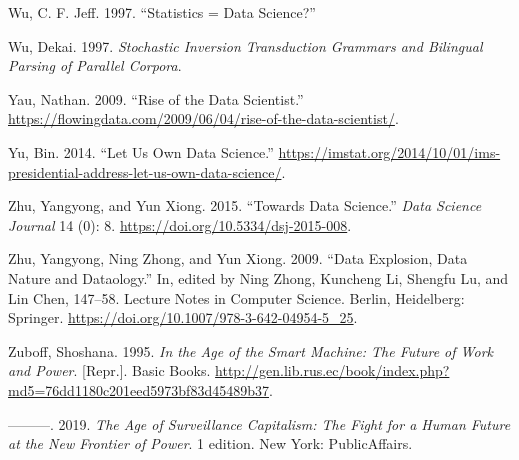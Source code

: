 \documentclass[
  letterpaper,
]{report}
\newlength{\cslhangindent}
\newlength{\cslentryspacingunit} %
\newenvironment{CSLReferences}[2] %
 {%
  \setlength{\parindent}{0pt}
  \ifodd #1
  \let\oldpar\par
  \def\par{\hangindent=\cslhangindent\oldpar}
  \fi
  \setlength{\parskip}{#2\cslentryspacingunit}
 }%
 {}
\begin{document}
\begin{CSLReferences}{1}{0}
\leavevmode{}%
Wu, C. F. Jeff. 1997. {``Statistics = Data Science?''}

\leavevmode{}%
Wu, Dekai. 1997. \emph{Stochastic Inversion Transduction Grammars and
Bilingual Parsing of Parallel Corpora}.

\leavevmode{}%
Yau, Nathan. 2009. {``Rise of the Data Scientist.''}
\url{https://flowingdata.com/2009/06/04/rise-of-the-data-scientist/}.

\leavevmode{}%
Yu, Bin. 2014. {``Let Us Own Data Science.''}
\url{https://imstat.org/2014/10/01/ims-presidential-address-let-us-own-data-science/}.

\leavevmode{}%
Zhu, Yangyong, and Yun Xiong. 2015. {``Towards Data Science.''}
\emph{Data Science Journal} 14 (0): 8.
\url{https://doi.org/10.5334/dsj-2015-008}.

\leavevmode{}%
Zhu, Yangyong, Ning Zhong, and Yun Xiong. 2009. {``Data Explosion, Data
Nature and Dataology.''} In, edited by Ning Zhong, Kuncheng Li, Shengfu
Lu, and Lin Chen, 147--58. Lecture Notes in Computer Science. Berlin,
Heidelberg: Springer.
\url{https://doi.org/10.1007/978-3-642-04954-5_25}.

\leavevmode{}%
Zuboff, Shoshana. 1995. \emph{In the Age of the Smart Machine: The
Future of Work and Power}. {[}Repr.{]}. Basic Books.
\url{http://gen.lib.rus.ec/book/index.php?md5=76dd1180c201eed5973bf83d45489b37}.

\leavevmode{}%
---------. 2019. \emph{The Age of Surveillance Capitalism: The Fight for
a Human Future at the New Frontier of Power}. 1 edition. New York:
PublicAffairs.

\end{CSLReferences}



\printindex
\end{document}
